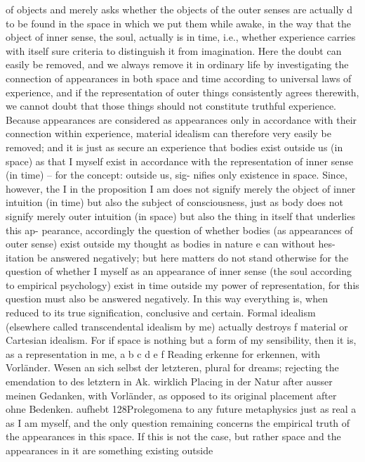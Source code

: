 of objects and merely asks whether the objects of the outer senses are
actually d to be found in the space in which we put them while awake,
in the way that the object of inner sense, the soul, actually is in time,
i.e., whether experience carries with itself sure criteria to distinguish it
from imagination. Here the doubt can easily be removed, and we always
remove it in ordinary life by investigating the connection of appearances
in both space and time according to universal laws of experience, and
if the representation of outer things consistently agrees therewith, we
cannot doubt that those things should not constitute truthful experience.
Because appearances are considered as appearances only in accordance
with their connection within experience, material idealism can therefore
very easily be removed; and it is just as secure an experience that bodies
exist outside us (in space) as that I myself exist in accordance with the
representation of inner sense (in time) – for the concept: outside us, sig-
niﬁes only existence in space. Since, however, the I in the proposition
I am does not signify merely the object of inner intuition (in time) but
also the subject of consciousness, just as body does not signify merely
outer intuition (in space) but also the thing in itself that underlies this ap-
pearance, accordingly the question of whether bodies (as appearances of
outer sense) exist outside my thought as bodies in nature e can without hes-
itation be answered negatively; but here matters do not stand otherwise
for the question of whether I myself as an appearance of inner sense (the
soul according to empirical psychology) exist in time outside my power
of representation, for this question must also be answered negatively. In
this way everything is, when reduced to its true signiﬁcation, conclusive
and certain. Formal idealism (elsewhere called transcendental idealism
by me) actually destroys f material or Cartesian idealism. For if space is
nothing but a form of my sensibility, then it is, as a representation in me,
a
b
c
d
e
f
Reading erkenne for erkennen, with Vorländer.
Wesen an sich selbst
der letzteren, plural for dreams; rejecting the emendation to des letztern in Ak.
wirklich
Placing in der Natur after ausser meinen Gedanken, with Vorländer, as opposed to its
original placement after ohne Bedenken.
aufhebt
128Prolegomena to any future metaphysics
just as real a as I am myself, and the only question remaining concerns
the empirical truth of the appearances in this space. If this is not the case,
but rather space and the appearances in it are something existing outside
